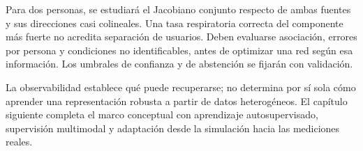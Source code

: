 Para dos personas, se estudiará el Jacobiano conjunto respecto de ambas fuentes y
sus direcciones casi colineales. Una tasa respiratoria correcta del componente
más fuerte no acredita separación de usuarios. Deben evaluarse asociación, errores
por persona y condiciones no identificables, antes de optimizar una red según esa
información. Los umbrales de confianza y de abstención se fijarán con validación.

La observabilidad establece qué puede recuperarse; no determina por sí sola cómo aprender
una representación robusta a partir de datos heterogéneos. El capítulo siguiente completa
el marco conceptual con aprendizaje autosupervisado, supervisión multimodal y adaptación
desde la simulación hacia las mediciones reales.

